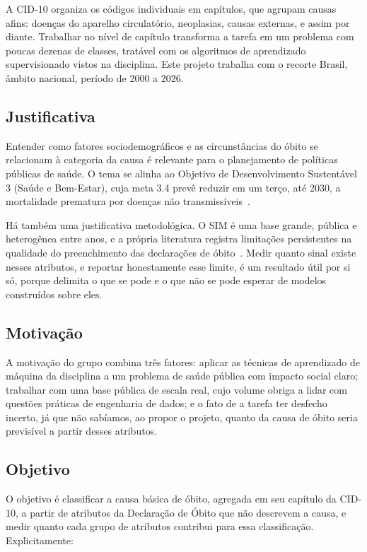 \documentclass[12pt]{article}
\begin{document}
A CID-10 organiza os códigos individuais em capítulos, que agrupam causas afins: doenças do aparelho circulatório, neoplasias, causas externas, e assim por diante. Trabalhar no nível de capítulo transforma a tarefa em um problema com poucas dezenas de classes, tratável com os algoritmos de aprendizado supervisionado vistos na disciplina. Este projeto trabalha com o recorte Brasil, âmbito nacional, período de 2000 a 2026.

\subsection{Justificativa}

Entender como fatores sociodemográficos e as circunstâncias do óbito se relacionam à categoria da causa é relevante para o planejamento de políticas públicas de saúde. O tema se alinha ao Objetivo de Desenvolvimento Sustentável 3 (Saúde e Bem-Estar), cuja meta 3.4 prevê reduzir em um terço, até 2030, a mortalidade prematura por doenças não transmissíveis~\cite{ods3}.

Há também uma justificativa metodológica. O SIM é uma base grande, pública e heterogênea entre anos, e a própria literatura registra limitações persistentes na qualidade do preenchimento das declarações de óbito~\cite{morais2017}. Medir quanto sinal existe nesses atributos, e reportar honestamente esse limite, é um resultado útil por si só, porque delimita o que se pode e o que não se pode esperar de modelos construídos sobre eles.

\subsection{Motivação}

A motivação do grupo combina três fatores: aplicar as técnicas de aprendizado de máquina da disciplina a um problema de saúde pública com impacto social claro; trabalhar com uma base pública de escala real, cujo volume obriga a lidar com questões práticas de engenharia de dados; e o fato de a tarefa ter desfecho incerto, já que não sabíamos, ao propor o projeto, quanto da causa de óbito seria previsível a partir desses atributos.

\subsection{Objetivo}

O objetivo é classificar a causa básica de óbito, agregada em seu capítulo da CID-10, a partir de atributos da Declaração de Óbito que não descrevem a causa, e medir quanto cada grupo de atributos contribui para essa classificação. Explicitamente:
\end{document}
